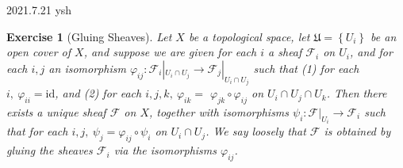 \documentclass[12pt]{amsart}
\newtheorem{exe}{Exercise}[subsection]
\begin{document}
2021.7.21 ysh

\begin{exe}[Gluing Sheaves]
	\label{2.1.22}
	Let $X$ be a topological space, let $\mathfrak{U}=\left\{U_{i}\right\}$ be an open cover of $X$, and suppose we are given for each $i$ a sheaf $\mathscr{F}_{i}$ on $U_{i}$, and for each $i, j$ an isomorphism $\varphi_{i j}:\mathscr{F}_{i}|_{U_{i} \cap U_{j}} \rightarrow \mathscr{F}_{j}|_{U_{i} \cap U_{j}}$ such that
	(1) for each $i,\ \varphi_{i i}=\mathrm{id}$, and
	(2) for each $i, j, k,\ \varphi_{i k}=$ $\varphi_{j k} \circ \varphi_{i j}$ on $U_{i} \cap U_{j} \cap U_{k} $. Then there exists a unique sheaf $\mathscr{F}$ on $X$, together with isomorphisms $\psi_{i}:\mathscr{F}|_{U_{i}} \rightarrow \mathscr{F}_{i}$ such that for each $i, j,\ \psi_{j}=\varphi_{i j} \circ \psi_{i}$ on $U_{i} \cap U_{j}$. We say loosely that $\mathscr{F}$ is
	obtained by gluing the sheaves $\mathscr{F}_{i}$ via the isomorphisms $\varphi_{i j}$.
\end{exe}
\end{document}
